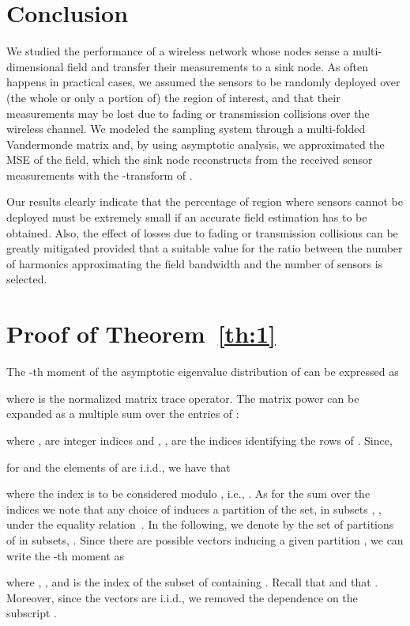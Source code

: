 \documentclass[11pt, draftcls, onecolumn, a4paper]{IEEEtran}
\begin{document}
\section{Conclusion\label{sec:conclusions}}
We studied the performance of a wireless network whose nodes
sense a multi-dimensional field and transfer their measurements to
a sink node. As often happens in practical cases, we assumed the sensors
to be randomly deployed over (the whole or only a portion of) the 
region of interest, and that their measurements may be lost due to
fading or transmission collisions over the wireless channel.
We modeled the sampling system through
a multi-folded Vandermonde matrix  and, by using asymptotic analysis, 
we approximated the MSE of the field, which the sink node reconstructs
from the received sensor measurements with the -transform of 
. 

Our results clearly indicate that the percentage of region where sensors cannot
be deployed must be extremely small if an accurate field estimation has to be obtained. Also, the effect of losses due to fading or transmission collisions
can be greatly mitigated provided that a suitable value for the
ratio between the number of harmonics approximating the field
bandwidth and the number of sensors is selected.


\appendices



\section{Proof of Theorem~\ref{th:1}}
\label{app:th1}
The -th moment of the asymptotic eigenvalue distribution of
 can be expressed as~\cite{TSP2}

where  is the normalized matrix trace operator.
The matrix power can be expanded as a multiple sum over the entries of
:

where ,  are integer indices and
,
,
 are the indices identifying the rows of .
Since, 

for  and the elements of  are i.i.d., we have that

where the index  is to be considered modulo , i.e., .  As for the sum over the indices  we note that any
choice of  induces a partition  of
the set,  in  subsets ,
, under the equality relation~\cite{TSP2}.  In the
following, we denote by  the set of partitions of 
in  subsets, . Since there are  possible vectors
 inducing a given partition , we can
write the -th moment as

where ,
, and
 is the index of the subset of 
containing . Recall that  and that
.  Moreover, since the vectors  are i.i.d., we
removed the dependence on the subscript .
\end{document}

